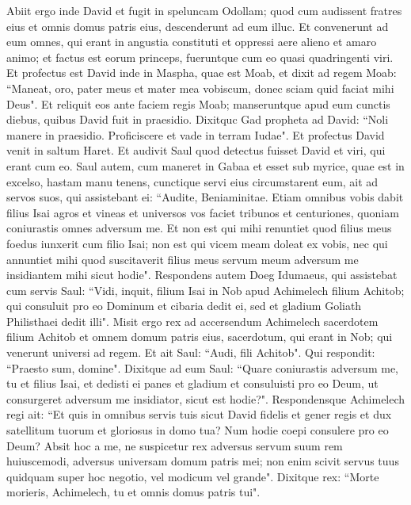 \begin{biblechapter}  
\verse Abiit ergo inde David et fugit in speluncam Odollam; quod cum audissent fratres eius et omnis domus patris eius, descenderunt ad eum illuc. 
\verse Et convenerunt ad eum omnes, qui erant in angustia constituti et oppressi aere alieno et amaro animo; et factus est eorum princeps, fueruntque cum eo quasi quadringenti viri. 
\verse Et profectus est David inde in Maspha, quae est Moab, et dixit ad regem Moab: “Maneat, oro, pater meus et mater mea vobiscum, donec sciam quid faciat mihi Deus". 
\verse Et reliquit eos ante faciem regis Moab; manseruntque apud eum cunctis diebus, quibus David fuit in praesidio. 
\verse Dixitquc Gad propheta ad David: “Noli manere in praesidio. Proficiscere et vade in terram Iudae". Et profectus David venit in saltum Haret. 
\verse Et audivit Saul quod detectus fuisset David et viri, qui erant cum eo. Saul autem, cum maneret in Gabaa et esset sub myrice, quae est in excelso, hastam manu tenens, cunctique servi eius circumstarent eum, 
\verse ait ad servos suos, qui assistebant ei: “Audite, Beniaminitae. Etiam omnibus vobis dabit filius Isai agros et vineas et universos vos faciet tribunos et centuriones, 
\verse quoniam coniurastis omnes adversum me. Et non est qui mihi renuntiet quod filius meus foedus iunxerit cum filio Isai; non est qui vicem meam doleat ex vobis, nec qui annuntiet mihi quod suscitaverit filius meus servum meum adversum me insidiantem mihi sicut hodie". 
\verse Respondens autem Doeg Idumaeus, qui assistebat cum servis Saul: “Vidi, inquit, filium Isai in Nob apud Achimelech filium Achitob; 
\verse qui consuluit pro eo Dominum et cibaria dedit ei, sed et gladium Goliath Philisthaei dedit illi". 
\verse Misit ergo rex ad accersendum Achimelech sacerdotem filium Achitob et omnem domum patris eius, sacerdotum, qui erant in Nob; qui venerunt universi ad regem. 
\verse Et ait Saul: “Audi, fili Achitob". Qui respondit: “Praesto sum, domine". 
\verse Dixitque ad eum Saul: “Quare coniurastis adversum me, tu et filius Isai, et dedisti ei panes et gladium et consuluisti pro eo Deum, ut consurgeret adversum me insidiator, sicut est hodie?". 
\verse Respondensque Achimelech regi ait: “Et quis in omnibus servis tuis sicut David fidelis et gener regis et dux satellitum tuorum et gloriosus in domo tua? 
\verse Num hodie coepi consulere pro eo Deum? Absit hoc a me, ne suspicetur rex adversus servum suum rem huiuscemodi, adversus universam domum patris mei; non enim scivit servus tuus quidquam super hoc negotio, vel modicum vel grande". 
\verse Dixitque rex: “Morte morieris, Achimelech, tu et omnis domus patris tui". 

\end{biblechapter}
